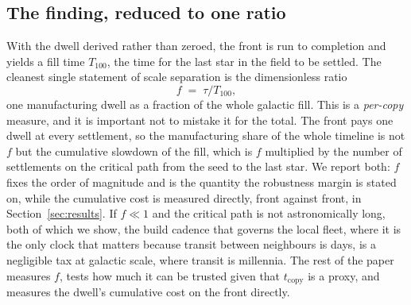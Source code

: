 \subsection{The finding, reduced to one ratio}
With the dwell derived rather than zeroed, the front is run to completion and yields a
fill time $T_{100}$, the time for the last star in the field to be settled. The cleanest
single statement of scale separation is the dimensionless ratio
\begin{equation}
f \;=\; \tau / T_{100},
\label{eq:frac}
\end{equation}
one manufacturing dwell as a fraction of the whole galactic fill. This is a \emph{per-copy}
measure, and it is important not to mistake it for the total. The front pays one dwell at every
settlement, so the manufacturing share of the whole timeline is not $f$ but the cumulative
slowdown of the fill, which is $f$ multiplied by the number of settlements on the critical path
from the seed to the last star. We report both: $f$ fixes the order of magnitude and is the
quantity the robustness margin is stated on, while the cumulative cost is measured directly,
front against front, in Section~\ref{sec:results}. If $f \ll 1$ and the critical path is not
astronomically long, both of which we show, the build cadence that governs the local fleet,
where it is the only clock that matters because transit between neighbours is days, is a
negligible tax at galactic scale, where transit is millennia. The rest of the paper measures
$f$, tests how much it can be trusted given that $t_\mathrm{copy}$ is a proxy, and measures the
dwell's cumulative cost on the front directly.
